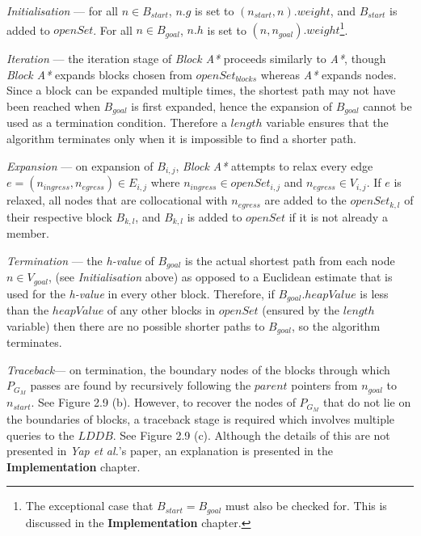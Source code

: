 \documentclass[12pt,notitlepage]{report}
\begin{document}
\begin{description}

\item[{\bfseries Algorithm walkthrough}]

\item{\em Initialisation} --- for all $n \in B_{start}$, $n.g$ is set to $(n_{start},n).weight$, and $B_{start}$ is added to $openSet$. For all $n \in B_{goal}$, $n.h$ is set to $(n,n_{goal}).weight$\footnote{The exceptional case that $B_{start} = B_{goal}$ must also be checked for. This is discussed in the {\bfseries Implementation} chapter.}.\\

\item{\em Iteration} --- the iteration stage of {\em Block A*} proceeds similarly to {\em A*}, though {\em Block A*} expands blocks chosen from $openSet_{blocks}$ whereas {\em A*} expands nodes. Since a block can be expanded multiple times, the shortest path may not have been reached when $B_{goal}$ is first expanded, hence the expansion of $B_{goal}$ cannot be used as a termination condition. Therefore a $length$ variable ensures that the algorithm terminates only when it is impossible to find a shorter path.\\

\item{\em Expansion} --- on expansion of $B_{i,j}$, {\em Block A*} attempts to relax every edge $e=(n_{ingress},n_{egress}) \in E_{i,j}$ where $n_{ingress} \in openSet_{i,j}$ and $n_{egress} \in V_{i,j}$. If $e$ is relaxed, all nodes that are collocational with $n_{egress}$ are added to the $openSet_{k,l}$ of their respective block $B_{k,l}$, and $B_{k,l}$ is added to $openSet$ if it is not already a member. \\

\item{\em Termination} --- the {\em h-value} of $B_{goal}$ is the actual shortest path from each node $n \in V_{goal}$, (see {\em Initialisation} above) as opposed to a Euclidean estimate that is used for the {\em h-value} in every other block. Therefore, if $B_{goal}.heapValue$ is less than the $heapValue$ of any other blocks in $openSet$ (ensured by the $length$ variable) then there are no possible shorter paths to $B_{goal}$, so the algorithm terminates.\\

\item{\em Traceback}--- on termination, the boundary nodes of the blocks through which $P_{G_{M}}$ passes are found by recursively following the $parent$ pointers from $n_{goal}$ to $n_{start}$. See Figure 2.9 (b). However, to recover the nodes of $P_{G_{M}}$ that do not lie on the boundaries of blocks, a traceback stage is required which involves multiple queries to the $LDDB$. See Figure 2.9 (c). Although the details of this are not presented in {\em Yap et al.}'s paper, an explanation is presented in the {\bfseries Implementation} chapter.\\

\end{description}
\end{document}
